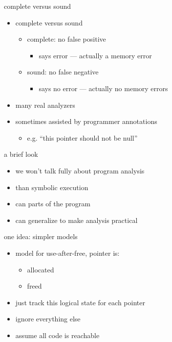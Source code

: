 \begin{frame}{complete versus sound}
    \begin{itemize}
        \item complete versus sound
            \begin{itemize}
                \item complete: no false positive
                    \begin{itemize}
                        \item says error --- actually a memory error
                    \end{itemize}
                \item sound: no false negative
                    \begin{itemize}
                        \item says no error --- actually no memory errors
                    \end{itemize}
            \end{itemize}
        \item many real analyzers 
        \item sometimes assisted by programmer annotations
            \begin{itemize}
                \item e.g. ``this pointer should not be null''
            \end{itemize}
    \end{itemize}
\end{frame}

\begin{frame}{a brief look}
    \begin{itemize}
    \item we won't talk fully about program analysis
    \item {} than symbolic execution
    \item can  parts of the program
    \item can generalize to make analysis practical
    \end{itemize}
\end{frame}

\begin{frame}{one idea: simpler models}
    \begin{itemize}
        \item model for use-after-free, pointer is:
            \begin{itemize}
            \item allocated
            \item freed
            \end{itemize}
        \item just track this logical state for each pointer
        \item ignore everything else
        \item assume all code is reachable
    \end{itemize}
\end{frame}

